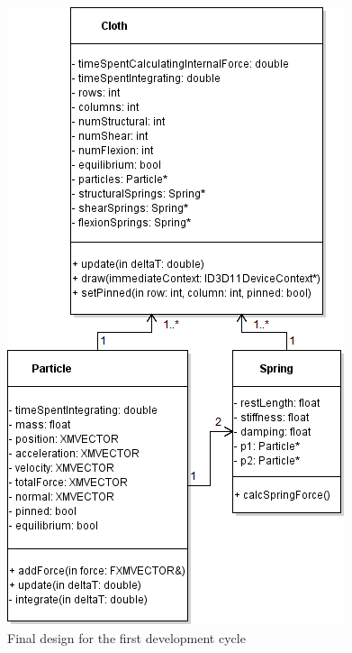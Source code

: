   \begin{figure}
    \begin{center}
      \includegraphics[scale=0.66]{Figures/cycle_1_final_design}
    \end{center}
    \caption{Final design for the first development cycle}
    \label{fig:phase1}
  \end{figure}
  
